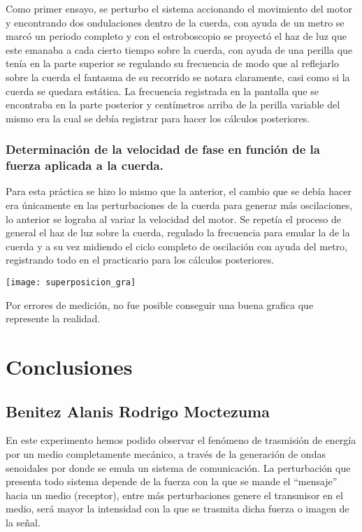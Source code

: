 \documentclass[11pt]{article}
\newenvironment{Figuras}
  {\par\medskip\noindent\minipage{\linewidth}}
  {\endminipage\par\medskip}
\begin{document}
\begin{multicols}{2}
					Como primer ensayo, se perturbo el sistema accionando el movimiento del motor y encontrando dos ondulaciones dentro de la cuerda, con ayuda de un metro se marcó un periodo completo y con el estroboscopio se proyectó el haz de luz que este emanaba a cada cierto tiempo sobre la cuerda, con ayuda de una perilla que tenía en la parte superior se regulando su frecuencia de modo que al reflejarlo sobre la cuerda el fantasma de su recorrido se notara claramente, casi como si la cuerda se quedara estática. La frecuencia registrada en la pantalla que se encontraba en la parte posterior y centímetros arriba de la perilla variable del mismo era la cual se debía registrar para hacer los cálculos posteriores.

				\subsubsection{Determinación de la velocidad de fase en función de la fuerza aplicada a la cuerda.}

					Para esta práctica se hizo lo mismo que la anterior, el cambio que se debía hacer era únicamente en las perturbaciones de la cuerda para generar más oscilaciones, lo anterior se lograba al variar la velocidad del motor. Se repetía el proceso de general el haz de luz sobre la cuerda, regulado la frecuencia para emular la de la cuerda y a su vez midiendo el ciclo completo de oscilación con ayuda del metro, registrando todo en el practicario para los cálculos posteriores.

					\begin{Figuras}
						\centering
					    \texttt{[image: superposicion\_gra]}
					    \label{fig:mesh1}
					\end{Figuras}

					Por errores de medición, no fue posible conseguir una buena grafica que represente la realidad.

\section{Conclusiones}
	
	\subsection{Benitez Alanis Rodrigo Moctezuma}
	
		En este experimento hemos podido observar el fenómeno de trasmisión de energía por un medio completamente mecánico, a través de la generación de ondas senoidales por donde se emula un sistema de comunicación. La perturbación que presenta todo sistema depende de la fuerza con la que se mande el “mensaje” hacia un medio (receptor), entre más perturbaciones genere el transmisor en el medio, será mayor la intensidad con la que se trasmita dicha fuerza o imagen de la señal.


\end{multicols}
\end{document}
